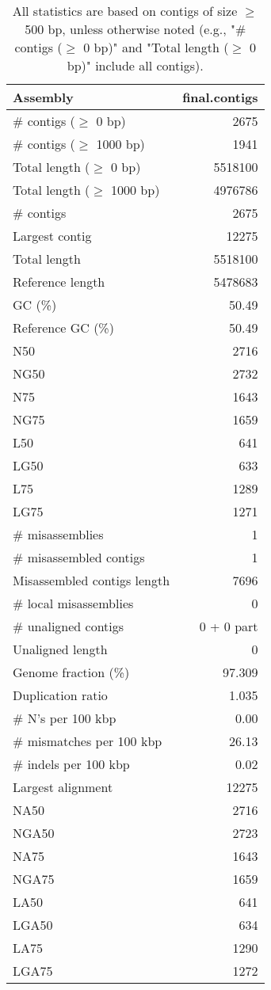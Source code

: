 \documentclass[12pt,a4paper]{article}
\begin{document}
\begin{table}[ht]
\begin{center}
\caption{All statistics are based on contigs of size $\geq$ 500 bp, unless otherwise noted (e.g., "\# contigs ($\geq$ 0 bp)" and "Total length ($\geq$ 0 bp)" include all contigs).}
\begin{tabular}{|l*{1}{|r}|}
\hline
Assembly & final.contigs \\ \hline
\# contigs ($\geq$ 0 bp) & 2675 \\ \hline
\# contigs ($\geq$ 1000 bp) & 1941 \\ \hline
Total length ($\geq$ 0 bp) & 5518100 \\ \hline
Total length ($\geq$ 1000 bp) & 4976786 \\ \hline
\# contigs & 2675 \\ \hline
Largest contig & 12275 \\ \hline
Total length & 5518100 \\ \hline
Reference length & 5478683 \\ \hline
GC (\%) & 50.49 \\ \hline
Reference GC (\%) & 50.49 \\ \hline
N50 & 2716 \\ \hline
NG50 & 2732 \\ \hline
N75 & 1643 \\ \hline
NG75 & 1659 \\ \hline
L50 & 641 \\ \hline
LG50 & 633 \\ \hline
L75 & 1289 \\ \hline
LG75 & 1271 \\ \hline
\# misassemblies & 1 \\ \hline
\# misassembled contigs & 1 \\ \hline
Misassembled contigs length & 7696 \\ \hline
\# local misassemblies & 0 \\ \hline
\# unaligned contigs & 0 + 0 part \\ \hline
Unaligned length & 0 \\ \hline
Genome fraction (\%) & 97.309 \\ \hline
Duplication ratio & 1.035 \\ \hline
\# N's per 100 kbp & 0.00 \\ \hline
\# mismatches per 100 kbp & 26.13 \\ \hline
\# indels per 100 kbp & 0.02 \\ \hline
Largest alignment & 12275 \\ \hline
NA50 & 2716 \\ \hline
NGA50 & 2723 \\ \hline
NA75 & 1643 \\ \hline
NGA75 & 1659 \\ \hline
LA50 & 641 \\ \hline
LGA50 & 634 \\ \hline
LA75 & 1290 \\ \hline
LGA75 & 1272 \\ \hline
\end{tabular}
\end{center}
\end{table}
\end{document}
